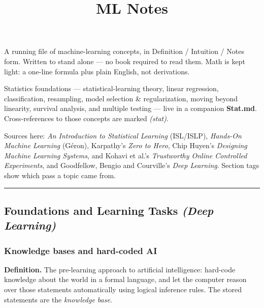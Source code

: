 \documentclass[
  10pt,
  letterpaper,
  onecolumn]{article}
\title{ML Notes}
\author{}
\date{}
\begin{document}
\maketitle

{
\hypersetup{linkcolor=black}
\setcounter{tocdepth}{2}
\tableofcontents
}
A running file of machine-learning concepts, in Definition / Intuition /
Notes form. Written to stand alone --- no book required to read them.
Math is kept light: a one-line formula plus plain English, not
derivations.

Statistics foundations --- statistical-learning theory, linear
regression, classification, resampling, model selection \&
regularization, moving beyond linearity, survival analysis, and multiple
testing --- live in a companion \textbf{Stat.md}. Cross-references to
those concepts are marked \emph{(stat)}.

Sources here: \emph{An Introduction to Statistical Learning} (ISL/ISLP),
\emph{Hands-On Machine Learning} (Géron), Karpathy's \emph{Zero to
Hero}, Chip Huyen's \emph{Designing Machine Learning Systems}, and
Kohavi et al.'s \emph{Trustworthy Online Controlled Experiments}, and
Goodfellow, Bengio and Courville's \emph{Deep Learning}.
Section tags show which pass a topic came from.

\begin{center}\rule{0.5\linewidth}{0.5pt}\end{center}

\hypertarget{foundations-and-learning-tasks-deep-learning}{%
\subsection{\texorpdfstring{Foundations and Learning Tasks \emph{(Deep
Learning)}}{Foundations and Learning Tasks (Deep Learning)}}\label{foundations-and-learning-tasks-deep-learning}}

\hypertarget{knowledge-bases-and-hard-coded-ai}{%
\subsubsection{Knowledge bases and hard-coded
AI}\label{knowledge-bases-and-hard-coded-ai}}

\textbf{Definition.} The pre-learning approach to artificial
intelligence: hard-code knowledge about the world in a formal language,
and let the computer reason over those statements automatically using
logical inference rules. The stored statements are the
\emph{knowledge base}.
\end{document}
